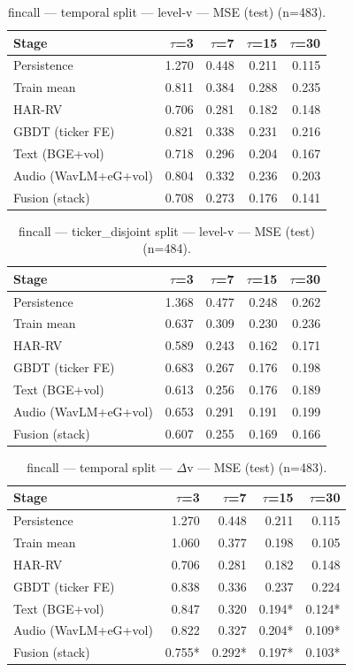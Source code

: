\begin{table}[t]
\centering
\begin{tabular}{lrrrr}
\toprule
Stage & $\tau$=3 & $\tau$=7 & $\tau$=15 & $\tau$=30 \\
\midrule
Persistence & 1.270 & 0.448 & 0.211 & 0.115 \\
Train mean & 0.811 & 0.384 & 0.288 & 0.235 \\
HAR-RV & 0.706 & 0.281 & 0.182 & 0.148 \\
GBDT (ticker FE) & 0.821 & 0.338 & 0.231 & 0.216 \\
Text (BGE+vol) & 0.718 & 0.296 & 0.204 & 0.167 \\
Audio (WavLM+eG+vol) & 0.804 & 0.332 & 0.236 & 0.203 \\
Fusion (stack) & 0.708 & 0.273 & 0.176 & 0.141 \\
\bottomrule
\end{tabular}
\caption{fincall — temporal split — level-v — MSE (test) (n=483).}
\end{table}

\begin{table}[t]
\centering
\begin{tabular}{lrrrr}
\toprule
Stage & $\tau$=3 & $\tau$=7 & $\tau$=15 & $\tau$=30 \\
\midrule
Persistence & 1.368 & 0.477 & 0.248 & 0.262 \\
Train mean & 0.637 & 0.309 & 0.230 & 0.236 \\
HAR-RV & 0.589 & 0.243 & 0.162 & 0.171 \\
GBDT (ticker FE) & 0.683 & 0.267 & 0.176 & 0.198 \\
Text (BGE+vol) & 0.613 & 0.256 & 0.176 & 0.189 \\
Audio (WavLM+eG+vol) & 0.653 & 0.291 & 0.191 & 0.199 \\
Fusion (stack) & 0.607 & 0.255 & 0.169 & 0.166 \\
\bottomrule
\end{tabular}
\caption{fincall — ticker\_disjoint split — level-v — MSE (test) (n=484).}
\end{table}

\begin{table}[t]
\centering
\begin{tabular}{lrrrr}
\toprule
Stage & $\tau$=3 & $\tau$=7 & $\tau$=15 & $\tau$=30 \\
\midrule
Persistence & 1.270 & 0.448 & 0.211 & 0.115 \\
Train mean & 1.060 & 0.377 & 0.198 & 0.105 \\
HAR-RV & 0.706 & 0.281 & 0.182 & 0.148 \\
GBDT (ticker FE) & 0.838 & 0.336 & 0.237 & 0.224 \\
Text (BGE+vol) & 0.847 & 0.320 & 0.194* & 0.124* \\
Audio (WavLM+eG+vol) & 0.822 & 0.327 & 0.204* & 0.109* \\
Fusion (stack) & 0.755* & 0.292* & 0.197* & 0.103* \\
\bottomrule
\end{tabular}
\caption{fincall — temporal split — $\Delta$v — MSE (test) (n=483).}
\end{table}

